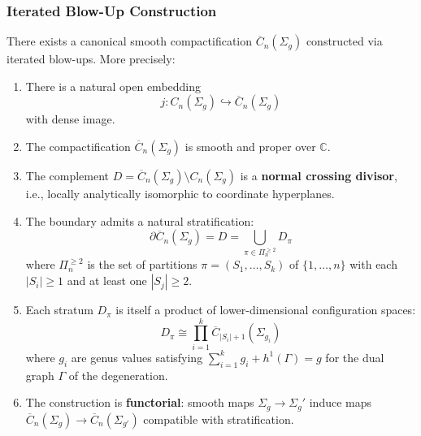 \subsubsection{Iterated Blow-Up Construction}

\begin{theorem}\label{thm:FM}
There exists a canonical smooth compactification $\overline{C}_n(\Sigma_g)$ constructed via iterated blow-ups. More precisely:

\begin{enumerate}
\item There is a natural open embedding
\[j: C_n(\Sigma_g) \hookrightarrow \overline{C}_n(\Sigma_g)\]
with dense image.

\item The compactification $\overline{C}_n(\Sigma_g)$ is smooth and proper over $\mathbb{C}$.

\item The complement $D = \overline{C}_n(\Sigma_g) \setminus C_n(\Sigma_g)$ is a \textbf{normal crossing divisor}, i.e., locally analytically isomorphic to coordinate hyperplanes.

\item The boundary admits a natural stratification:
$$\partial\overline{C}_n(\Sigma_g) = D = \bigcup_{\pi \in \Pi_n^{\geq 2}} D_\pi$$
where $\Pi_n^{\geq 2}$ is the set of partitions $\pi = (S_1, \ldots, S_k)$ of $\{1,\ldots,n\}$ with each $|S_i| \geq 1$ and at least one $|S_j| \geq 2$.

\item Each stratum $D_\pi$ is itself a product of lower-dimensional configuration spaces:
$$D_\pi \cong \prod_{i=1}^k \overline{C}_{|S_i|+1}(\Sigma_{g_i})$$
where $g_i$ are genus values satisfying $\sum_{i=1}^k g_i + h^1(\Gamma) = g$ for the dual graph $\Gamma$ of the degeneration.

\item The construction is \textbf{functorial}: smooth maps $\Sigma_g \to \Sigma_g'$ induce maps $\overline{C}_n(\Sigma_g) \to \overline{C}_n(\Sigma_{g'})$ compatible with stratification.
\end{enumerate}
\end{theorem}

